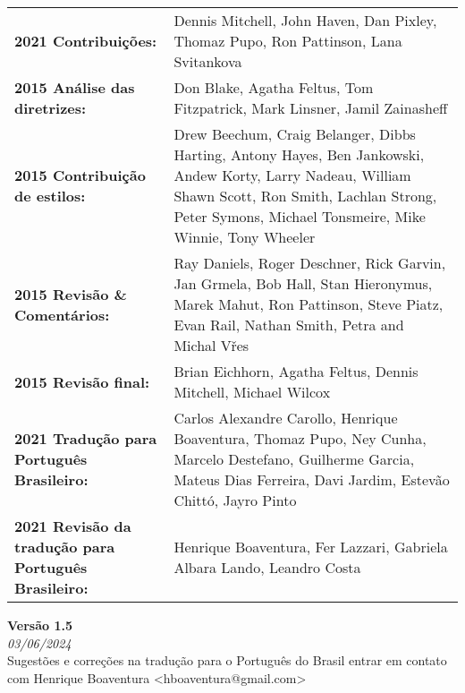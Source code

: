 \begin{titlepage}
        \begin{tabular}{ p{6.5cm} p{11.5cm} }
            \textbf{2021 Contribuições:}	& Dennis Mitchell, John Haven, Dan Pixley, Thomaz Pupo, Ron Pattinson, Lana Svitankova \\
            \textbf{2015 Análise das diretrizes:} & Don Blake, Agatha Feltus, Tom Fitzpatrick, Mark Linsner, Jamil Zainasheff \\
            \textbf{2015 Contribuição de estilos:} & Drew Beechum, Craig Belanger, Dibbs Harting, Antony Hayes, Ben Jankowski, Andew Korty,
            Larry Nadeau, William Shawn Scott, Ron Smith, Lachlan Strong, Peter Symons, Michael Tonsmeire, Mike Winnie, Tony Wheeler \\
            \textbf{2015 Revisão \& Comentários:} & Ray Daniels, Roger Deschner, Rick Garvin, Jan Grmela, Bob Hall, Stan Hieronymus, Marek Mahut, Ron Pattinson, Steve Piatz, Evan Rail, Nathan Smith, Petra and Michal Vřes\\
            \textbf{2015 Revisão final:} & Brian Eichhorn, Agatha Feltus, Dennis Mitchell, Michael Wilcox  \\
            \textbf{2021 Tradução para Português Brasileiro:} & Carlos Alexandre Carollo, Henrique Boaventura, Thomaz Pupo, Ney Cunha, Marcelo Destefano, Guilherme Garcia, Mateus Dias Ferreira, Davi Jardim, Estevão Chittó, Jayro Pinto \\
            \textbf{2021 Revisão da tradução para Português Brasileiro:} & Henrique Boaventura, Fer Lazzari, Gabriela Albara Lando, Leandro Costa
        \end{tabular}
        \vspace{0.5cm}
        \textbf{Versão 1.5}\\
        \footnotesize{\textit{03/06/2024}}\\
        \vspace{0.4cm}
        \footnotesize{Sugestões e correções na tradução para o Português do Brasil entrar em contato com Henrique Boaventura <hboaventura@gmail.com>}

\end{titlepage}
